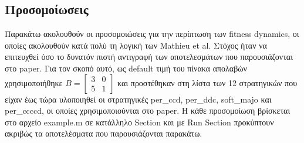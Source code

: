\documentclass[12pt]{article}
\begin{document}
\subsection{Προσομοίωσεις}
Παρακάτω ακολουθούν οι προσομοιώσεις για την περίπτωση των fitness dy\-na\-mics, οι οποίες ακολουθούν κατά πολύ τη λογική των Mathieu et al. Στόχος ήταν να επιτευχθεί όσο το δυνατόν πιστή αντιγραφή των αποτελεσμάτων που παρουσιάζονται στο paper. Για τον σκοπό αυτό, ως default τιμή του πίνακα απολαβών χρησιμοποιήθηκε $B = \begin{bmatrix} 3 & 0 \\5 & 1 \end{bmatrix}$ και προστέθηκαν στη λίστα των 12 στρατηγικών που είχαν έως τώρα υλοποιηθεί οι στρατηγικές per\_ccd, per\_ddc, soft\_majo και per\_ccccd, οι οποίες χρησιμοποιούνται στο paper. Η κάθε προσομοίωση βρίσκεται στο αρχείο example.m σε κατάλληλο Section και με Run Section προκύπτουν ακριβώς τα αποτελέσματα που παρουσιάζονται παρακάτω.
\end{document}

